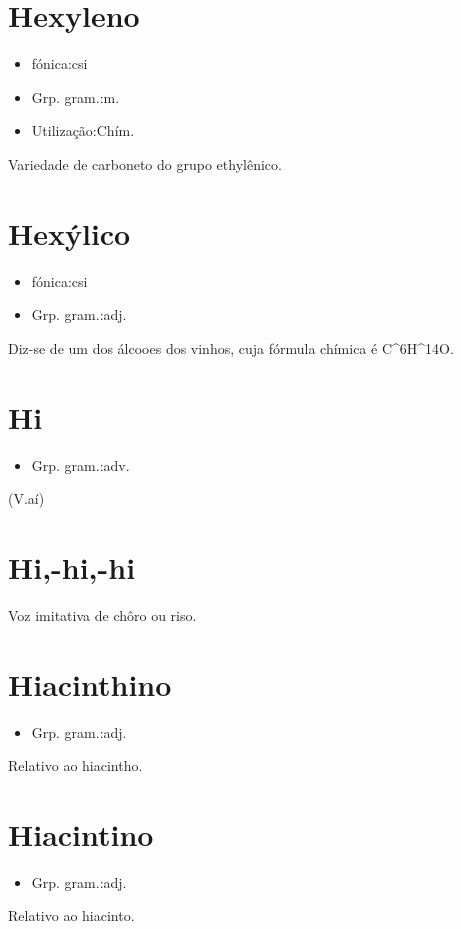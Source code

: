 \documentclass{article}
\begin{document}
\section{Hexyleno}
\begin{itemize}
\item {fónica:csi}
\end{itemize}
\begin{itemize}
\item {Grp. gram.:m.}
\end{itemize}
\begin{itemize}
\item {Utilização:Chím.}
\end{itemize}
Variedade de carboneto do grupo ethylênico.
\section{Hexýlico}
\begin{itemize}
\item {fónica:csi}
\end{itemize}
\begin{itemize}
\item {Grp. gram.:adj.}
\end{itemize}
Diz-se de um dos álcooes dos vinhos, cuja fórmula chímica é C^{6}H^{14}O.
\section{Hi}
\begin{itemize}
\item {Grp. gram.:adv.}
\end{itemize}
(V.aí)
\section{Hi,-hi,-hi}
Voz imitativa de chôro ou riso.
\section{Hiacinthino}
\begin{itemize}
\item {Grp. gram.:adj.}
\end{itemize}
Relativo ao hiacintho.
\section{Hiacintino}
\begin{itemize}
\item {Grp. gram.:adj.}
\end{itemize}
Relativo ao hiacinto.
\end{document}
